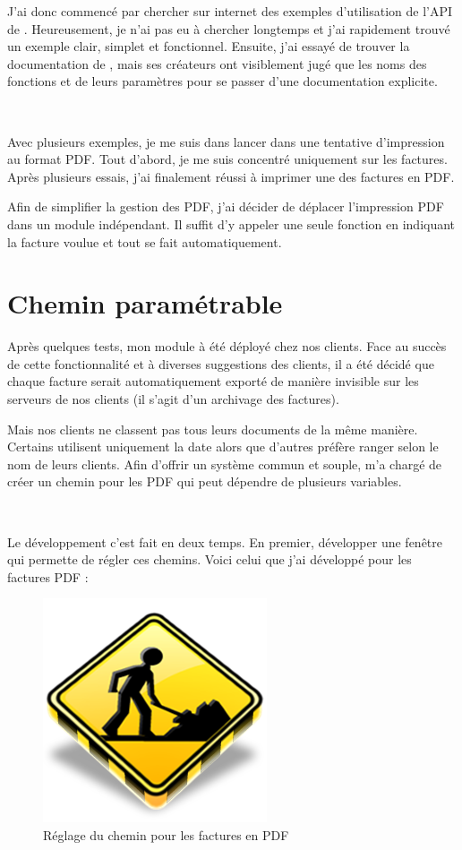 J'ai donc commencé par chercher sur internet des exemples d'utilisation de l'API de \pdfcreator. Heureusement, je n'ai pas eu à chercher longtemps et j'ai rapidement trouvé un exemple clair, simplet et fonctionnel. Ensuite, j'ai essayé de trouver la documentation de \pdfcreator, mais ses créateurs ont visiblement jugé que les noms des fonctions et de leurs paramètres pour se passer d'une documentation explicite.

~

Avec plusieurs exemples, je me suis dans lancer dans une tentative d'impression au format PDF. Tout d'abord, je me suis concentré uniquement sur les factures. Après plusieurs essais, j'ai finalement réussi à imprimer une des factures en PDF.

Afin de simplifier la gestion des PDF, j'ai décider de déplacer l'impression PDF dans un module indépendant. Il suffit d'y appeler une seule fonction en indiquant la facture voulue et tout se fait automatiquement.

\section{Chemin paramétrable}
Après quelques tests, mon module à été déployé chez nos clients. Face au succès de cette fonctionnalité et à diverses suggestions des clients, il a été décidé que chaque facture serait automatiquement exporté de manière invisible sur les serveurs de nos clients (il s'agit d'un archivage des factures).

Mais nos clients ne classent pas tous leurs documents de la même manière. Certains utilisent uniquement la date alors que d'autres préfère ranger selon le nom de leurs clients. Afin d'offrir un système commun et souple, \solulog{} m'a chargé de créer un chemin pour les PDF qui peut dépendre de plusieurs variables.

~

Le développement c'est fait en deux temps. En premier, développer une fenêtre qui permette de régler ces chemins. Voici celui que j'ai développé pour les factures PDF :
\begin{figure}[h!]
	\begin{center}
		\includegraphics[scale=1]{Contenu/Synthese_SeptembreAvril/Images/Chemin_PDF.png}
	\end{center}

	\caption{Réglage du chemin pour les factures en PDF}
	\label{segment_NAD_CA}
\end{figure}

